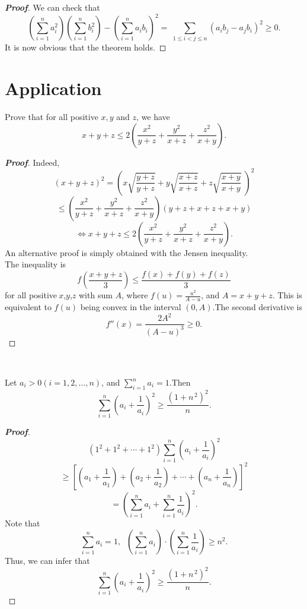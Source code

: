 \documentclass[a4paper]{report}
\begin{document}
\begin{proof}[\bf{Proof}]
We can check that
\[\left(\sum_{i=1}^na_i^2\right)\left(\sum_{i=1}^nb_i^2\right) -
\left(\sum_{i=1}^na_ib_i\right)^2 =\ \sum_{1\leqslant i<j\leqslant n}(a_ib_j-a_jb_i)^2 \geqslant 0 .\]
 It is now obvious that the theorem holds.
\end{proof}
\par \;

\section{Application}
\begin{myex}
	
	Prove that for all positive $x,y$ and $z$, we have
	\[x+y+z\leqslant 2\left(\frac{x^2}{y+z}+\frac{y^2}{x+z}+\frac{z^2}{x+y}\right).
	\]
\end{myex}	

\begin{proof}[\bf{Proof}]
Indeed,	\[(x+y+z)^2=\left(x\sqrt{\frac{y+z}{y+z}}+y\sqrt{\frac{x+z}{x+z}}+z\sqrt{\frac{x+y}{x+y}}\;\right)^2\]
\[\leqslant \left(\frac{x^2}{y+z}+\frac{y^2}{x+z}+\frac{z^2}{x+y}\right)(y+z+x+z+x+y)
	\]
\[\iff x+y+z\leqslant 2\left(\frac{x^2}{y+z}+\frac{y^2}{x+z}+\frac{z^2}{x+y}\right).\]
	An alternative proof is simply obtained with the Jensen inequality.\\
	The inequality is
	\[f\left(\frac{x+y+z}{3}\right)\leqslant\frac{f(x)+f(y)+f(z)}{3}
	\]
	for all positive$\ x$,$y$,$z$ with sum $A$, where $\displaystyle f(u)=\frac{u^2}{A-u}$, and $A=x+y+z$.
	This is equivalent to $f(u)$ being convex in the interval $(0,A)$.The second derivative is\[f''(x) =\frac{2A^2}{(A-u)^3}\geqslant 0 . \]
	\end{proof}
\par \ 

\begin{myex}
Let $a_i>0 (i=1,2,\dots,n)$,  and $\sum\limits_{i=1}^n a_i=1$.Then\[\sum \limits^{n}_{i=1}\left(a_{i}+\frac{1}{a_{i}}
\right)^{2}\geqslant\frac{(1+n^{\,2})^{2}}{n} .\]
\end{myex}

\begin{proof}[\bf{Proof}]
\[(1^{2}+1^{2}+ \cdots+1^{2})\sum \limits^{n}_{i=1}\left( a_{i}+\frac{1}{a_{i}} \right) ^{2}\]
\[\geqslant\left[ \left( a_{1}+\frac{1}{a_{1}}  \right) +\left( a_{2}+\frac{1}{a_{2}} \right)+\cdots+ \left( a_{n}+\frac{1}{a_{n}} \right)\right]^2 \]
\[=\left(\sum^n_{i=1}a_i+\sum_{i=1}^n\frac{1}{a_i}\right)^2.\]
Note that\[\sum^n_{i=1}a_i=1,  \;\; \left(\sum^n_{i=1}a_i\right)\cdot\left(\sum_{i=1}^n\frac{1}{a_i}\right)\geqslant n^{2}.\]
Thus, we can infer that
\[\sum \limits^{n}_{i=1}\left(a_{i}+\frac{1}{a_{i}}
\right)^{2}\geqslant\frac{(1+n^{\,2})^{2}}{n} .\]
\end{proof}
\par \quad
\end{document}
